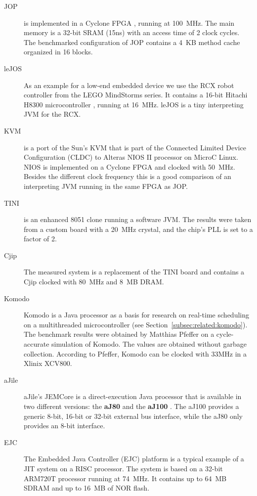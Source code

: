 \begin{description}
    \item[JOP]
is implemented in a Cyclone FPGA \cite{AltCyc}, running at 100~MHz.
The main memory is a 32-bit SRAM (15ns) with an access time of 2
clock cycles. The benchmarked configuration of JOP contains a 4~KB
method cache organized in 16 blocks.

    \item[leJOS]
As an example for a low-end embedded device we use the RCX robot
controller from the LEGO MindStorms series. It contains a 16-bit
Hitachi H8300 microcontroller \cite{hitachi:h8}, running at 16~MHz.
leJOS \cite{lejos} is a tiny interpreting JVM for the RCX.

    \item[KVM]
is a port of the Sun's KVM that is part of the Connected Limited
Device Configuration (CLDC) \cite{J2ME} to Alteras NIOS II processor
on MicroC Linux. NIOS is implemented on a Cyclone FPGA and clocked
with 50~MHz. Besides the different clock frequency this is a good
comparison of an interpreting JVM running in the same FPGA as JOP.

    \item[TINI]
is an enhanced 8051 clone running a software JVM. The results were
taken from a custom board with a 20~MHz crystal, and the chip's PLL
is set to a factor of 2.

    \item[Cjip]
The measured system \cite{SNAP} is a replacement of the TINI board
and contains a Cjip \cite{Cjip} clocked with 80~MHz and 8~MB DRAM.

    \item[Komodo]
Komodo \cite{komodo2003} is a Java processor as a basis for research
on real-time scheduling on a multithreaded microcontroller (see
Section~\ref{subsec:related:komodo}). The benchmark results were
obtained by Matthias Pfeffer \cite{Pfeffer} on a cycle-accurate
simulation of Komodo. The values are obtained without garbage
collection. According to Pfeffer, Komodo can be clocked with 33MHz
in a Xlinix XCV800.

    \item[aJile]
aJile's JEMCore is a direct-execution Java processor that is
available in two different versions: the \textbf{aJ80} and the
\textbf{aJ100} \cite{aJile}. The aJ100 provides a generic 8-bit,
16-bit or 32-bit external bus interface, while the aJ80 only
provides an 8-bit interface.


    \item[EJC]
The Embedded Java Controller (EJC) platform \cite{EJC} is a typical
example of a JIT system on a RISC processor. The system is based on
a 32-bit ARM720T processor running at 74~MHz. It contains up to
64~MB SDRAM and up to 16~MB of NOR flash.


\end{description}
